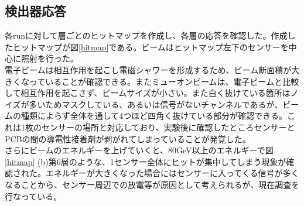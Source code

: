\subsection{検出器応答}
各runに対して層ごとのヒットマップを作成し、各層の応答を確認した。作成したヒットマップが図\ref{hitmap}である。ビームはヒットマップ左下のセンサーを中心に照射を行った。\\
電子ビームは相互作用を起こし電磁シャワーを形成するため、ビーム断面積が大きくなっていることが確認できる。またミューオンビームは、電子ビームと比較して相互作用を起こさず、ビームサイズが小さい。また白く抜けている箇所はノイズが多いためマスクしている、あるいは信号がないチャンネルであるが、ビームの種類によらず全体を通して4つほど四角く抜けている部分が確認できる。これは1枚のセンサーの場所と対応しており、実験後に確認したところセンサーとPCBの間の導電性接着剤が剥がれてしまっていることが発覚した。\\
さらにビームのエネルギーを上げていくと、80GeV以上のエネルギーで図\ref{hitmap} (b)第6層のような、1センサー全体にヒットが集中してしまう現象が確認された。エネルギーが大きくなった場合にはセンサーに入ってくる信号が多くなることから、センサー周辺での放電等が原因として考えられるが、現在調査を行なっている。
